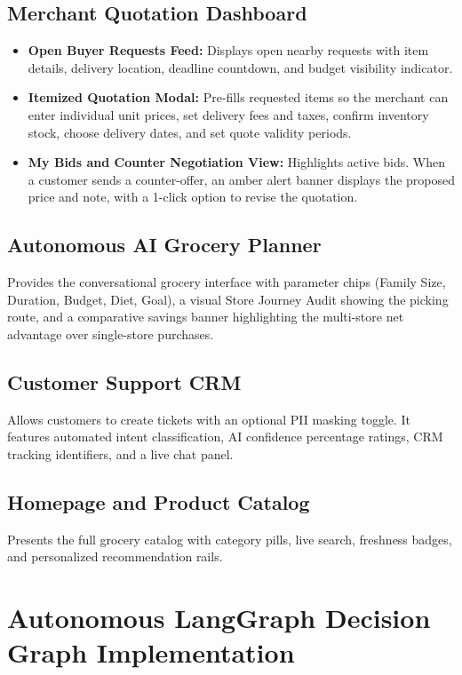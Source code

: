 \subsection{Merchant Quotation Dashboard}
\begin{itemize}
    \item \textbf{Open Buyer Requests Feed:} Displays open nearby requests with item details, delivery location, deadline countdown, and budget visibility indicator.
    \item \textbf{Itemized Quotation Modal:} Pre-fills requested items so the merchant can enter individual unit prices, set delivery fees and taxes, confirm inventory stock, choose delivery dates, and set quote validity periods.
    \item \textbf{My Bids and Counter Negotiation View:} Highlights active bids. When a customer sends a counter-offer, an amber alert banner displays the proposed price and note, with a 1-click option to revise the quotation.
\end{itemize}

\subsection{Autonomous AI Grocery Planner}
Provides the conversational grocery interface with parameter chips (Family Size, Duration, Budget, Diet, Goal), a visual Store Journey Audit showing the picking route, and a comparative savings banner highlighting the multi-store net advantage over single-store purchases.

\subsection{Customer Support CRM}
Allows customers to create tickets with an optional PII masking toggle. It features automated intent classification, AI confidence percentage ratings, CRM tracking identifiers, and a live chat panel.

\subsection{Homepage and Product Catalog}
Presents the full grocery catalog with category pills, live search, freshness badges, and personalized recommendation rails.

\section{Autonomous LangGraph Decision Graph Implementation}

